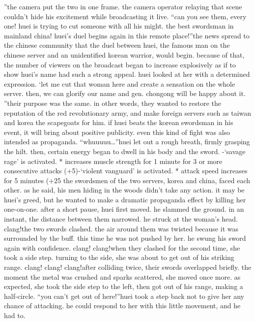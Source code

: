 ”the camera put the two in one frame.
 the camera operator relaying that scene couldn’t hide his excitement while broadcasting it live.
“can you see them, every one! huei is trying to cut someone with all his might.
 the best swordsman in mainland china! huei’s duel begins again in this remote place!”the news spread to the chinese community that the duel between huei, the famous man on the chinese server and an unidentified korean warrior, would begin.
because of that, the number of viewers on the broadcast began to increase explosively as if to show huei’s name had such a strong appeal.
huei looked at her with a determined expression.
‘let me cut that woman here and create a sensation on the whole server.
 then, we can glorify our name and gen.
 chongong will be happy about it.
”their purpose was the same.
 in other words, they wanted to restore the reputation of the red revolutionary army, and make foreign servers such as taiwan and korea the scapegoats for him.
if huei beats the korean swordsman in his event, it will bring about positive publicity.
 even this kind of fight was also intended as propaganda.
“whuuuuu…”huei let out a rough breath, firmly grasping the hilt.
 then, certain energy began to dwell in his body and the sword.
-‘savage rage’ is activated.
* increases muscle strength for 1 minute for 3 or more consecutive attacks (+5)-‘violent vanguard’ is activated.
* attack speed increases for 5 minutes (+25%
the swordsmen of the two servers, korea and china, faced each other.
 as he said, his men hiding in the woods didn’t take any action.
 it may be huei’s greed, but he wanted to make a dramatic propaganda effect by killing her one-on-one.
after a short pause, huei first moved.
 he slammed the ground.
 in an instant, the distance between them narrowed.
 he struck at the woman’s head.
clang!the two swords clashed.
 the air around them was twisted because it was surrounded by the buff.
 this time he was not pushed by her.
 he swung his sword again with confidence.
clang! clang!when they clashed for the second time, she took a side step.
 turning to the side, she was about to get out of his striking range.
clang! clang! clang!after colliding twice, their swords overlapped briefly.
 the moment the metal was crushed and sparks scattered, she moved once more.
 as expected, she took the side step to the left, then got out of his range, making a half-circle.
“you can’t get out of here!”huei took a step back not to give her any chance of attacking.
 he could respond to her with this little movement, and he had to.


